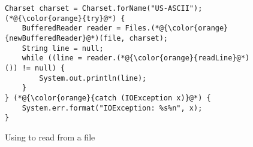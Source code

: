 \begin{figure}[t]%
	\centering
\begin{lstlisting}[]
Charset charset = Charset.forName("US-ASCII");
(*@{\color{orange}{try}@*) {
    BufferedReader reader = Files.(*@{\color{orange}{newBufferedReader}@*)(file, charset);
    String line = null;
    while ((line = reader.(*@{\color{orange}{readLine}@*)()) != null) {
        System.out.println(line);
    }
} (*@{\color{orange}{catch (IOException x)}@*) {
    System.err.format("IOException: %s%n", x);
}
\end{lstlisting}
        \vspace{-16pt}
        \caption{Using  to read from a file}
        \label{fig:example4}
\end{figure}
